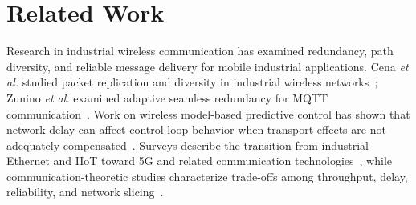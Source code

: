 \documentclass[conference]{IEEEtran}
\begin{document}
\section{Related Work}
\label{sec:related_work}

Research in industrial wireless communication has examined redundancy, path diversity, and reliable message delivery for mobile industrial applications. Cena \textit{et al.} studied packet replication and diversity in industrial wireless networks~\cite{cena2021redundancy}; Zunino \textit{et al.} examined adaptive seamless redundancy for MQTT communication~\cite{zunino2024adaptive}. Work on wireless model-based predictive control has shown that network delay can affect control-loop behavior when transport effects are not adequately compensated~\cite{ferrari2011wireless}. Surveys describe the transition from industrial Ethernet and IIoT toward 5G and related communication technologies~\cite{vitturi2019industrial}, while communication-theoretic studies characterize trade-offs among throughput, delay, reliability, and network slicing~\cite{popovski20185g}.
\end{document}
